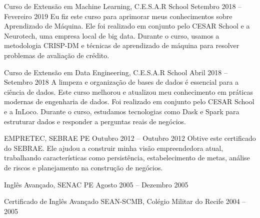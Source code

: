 
\cvmetaevent
{Curso de Extensão em Machine Learning, C.E.S.A.R School}
{Setembro 2018 – Fevereiro 2019}
{}
{Eu fiz este curso para aprimorar meus conhecimentos sobre Aprendizado de Máquina. Ele foi realizado em conjunto pelo CESAR School e a Neurotech, uma empresa local de big data. Durante o curso, usamos a metodologia CRISP-DM e técnicas de aprendizado de máquina para resolver problemas de avaliação de crédito.}

\cvmetaevent
{Curso de Extensão em Data Engineering, C.E.S.A.R School}
{Abril 2018 – Setembro 2018}
{}
{A limpeza e organização de bases de dados é essencial para a ciência de dados. Este curso melhorou e atualizou meu conhecimento em práticas modernas de engenharia de dados. Foi realizado em conjunto pelo CESAR School e a InLoco. Durante o curso, estudamos tecnologias como Dask e Spark para estruturar dados e responder a perguntas reais de negócios.}

\cvmetaevent
{EMPRETEC, SEBRAE PE}
{Outubro 2012 – Outubro 2012}
{}
{Obtive este certificado do SEBRAE. Ele ajudou a construir minha visão empreendedora atual, trabalhando características como persistência, estabelecimento de metas, análise de riscos e planejamento na construção de negócios.}

\cvmetaevent
{Inglês Avançado, SENAC PE}
{Agosto 2005 – Dezembro 2005}
{}
{}

\cvmetaevent
{Certificado de Inglês Avançado SEAN-SCMB, Colégio Militar do Recife}
{2004 – 2005}
{}
{}
